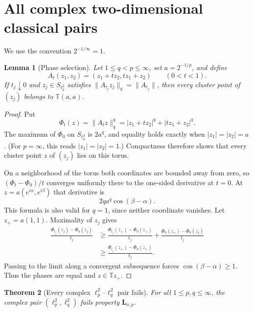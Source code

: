 \documentclass[11pt]{article}
\newtheorem{theorem}{Theorem}
\newtheorem{lemma}[theorem]{Lemma}
\newcommand{\T}{\mathbb T}
\begin{document}
\section{All complex two-dimensional classical pairs}

We use the convention $2^{-1/\infty}=1$.

\begin{lemma}[Phase selection]
\label{lem:phase}
Let $1\le q<p\le\infty$, set $a=2^{-1/p}$, and define
\[
 A_t(z_1,z_2)=(z_1+t z_2,t z_1+z_2)
 \qquad(0<t<1).
\]
If $t_j\downarrow0$ and $z_j\in S_{\ell_p^2}$ satisfies
$\|A_{t_j}z_j\|_q=\|A_{t_j}\|$, then every cluster point of $(z_j)$
belongs to $\T(a,a)$.
\end{lemma}

\begin{proof}
Put
\[
 \Phi_t(z)=\|A_tz\|_q^q
 =|z_1+t z_2|^q+|t z_1+z_2|^q.
\]
The maximum of $\Phi_0$ on $S_{\ell_p^2}$ is
$2a^q$, and equality holds exactly when $|z_1|=|z_2|=a$.  (For
$p=\infty$, this reads $|z_1|=|z_2|=1$.)  Compactness therefore shows that
every cluster point $z$ of $(z_j)$ lies on this torus.

On a neighborhood of the torus both coordinates are bounded away from zero,
so $(\Phi_t-\Phi_0)/t$ converges uniformly there to the one-sided derivative
at $t=0$.  At
$z=a(e^{i\alpha},e^{i\beta})$ that derivative is
\[
 2q a^q\cos(\beta-\alpha).
\]
This formula is also valid for $q=1$, since neither coordinate vanishes.
Let $z_+=a(1,1)$.  Maximality of $z_j$ gives
\begin{align*}
 \frac{\Phi_{t_j}(z_j)-\Phi_0(z_j)}{t_j}
 &\ge
 \frac{\Phi_{t_j}(z_+)-\Phi_0(z_+)}{t_j}
 +\frac{\Phi_0(z_+)-\Phi_0(z_j)}{t_j}\\
 &\ge
 \frac{\Phi_{t_j}(z_+)-\Phi_0(z_+)}{t_j}.
\end{align*}
Passing to the limit along a convergent subsequence forces
$\cos(\beta-\alpha)\ge1$.  Thus the phases are equal and
$z\in\T z_+$.
\end{proof}

\begin{theorem}[Every complex $\ell_p^2$--$\ell_q^2$ pair fails]
\label{thm:lp}
For all $1\le p,q\le\infty$, the complex pair
$(\ell_p^2,\ell_q^2)$ fails property $\mathbf L_{o,p}$.
\end{theorem}
\end{document}
